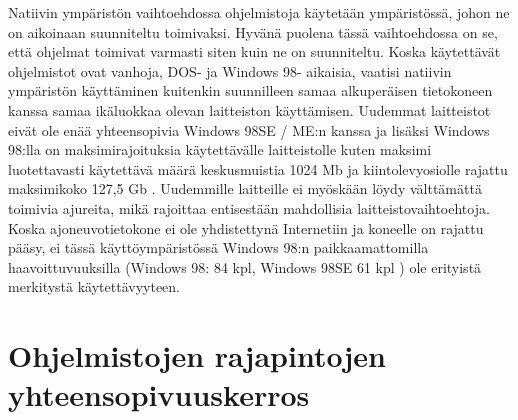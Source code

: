 


Natiivin ympäristön vaihtoehdossa ohjelmistoja käytetään ympäristössä, johon ne on aikoinaan suunniteltu toimivaksi. Hyvänä puolena tässä vaihtoehdossa on se, että ohjelmat toimivat varmasti siten kuin ne on suunniteltu. Koska käytettävät ohjelmistot ovat vanhoja, DOS- ja Windows 98- aikaisia, vaatisi natiivin ympäristön käyttäminen kuitenkin suunnilleen samaa alkuperäisen tietokoneen kanssa samaa ikäluokkaa olevan laitteiston käyttämisen. Uudemmat laitteistot eivät ole enää yhteensopivia Windows 98SE / ME:n kanssa ja lisäksi Windows 98:lla on maksimirajoituksia käytettävälle laitteistolle kuten maksimi luotettavasti käytettävä määrä keskusmuistia 1024 Mb ja kiintolevyosiolle rajattu maksimikoko 127,5 Gb \cite{win98:maxspecs}. Uudemmille laitteille ei myöskään löydy välttämättä toimivia ajureita, mikä rajoittaa entisestään mahdollisia laitteistovaihtoehtoja. Koska ajoneuvotietokone ei ole yhdistettynä Internetiin ja koneelle on rajattu pääsy, ei tässä käyttöympäristössä Windows 98:n paikkaamattomilla haavoittuvuuksilla (Windows 98: 84 kpl, Windows 98SE 61 kpl \cite{win98:vulns}) ole erityistä merkitystä käytettävyyteen.

\section{Ohjelmistojen rajapintojen yhteensopivuuskerros}



%

